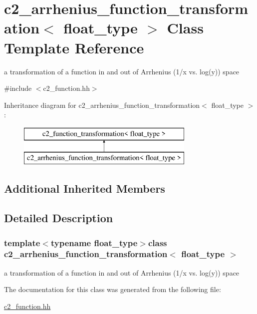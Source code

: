\hypertarget{classc2__arrhenius__function__transformation}{\section{c2\-\_\-arrhenius\-\_\-function\-\_\-transformation$<$ float\-\_\-type $>$ Class Template Reference}
\label{classc2__arrhenius__function__transformation}
}


a transformation of a function in and out of Arrhenius (1/x vs. log(y)) space  




{\ttfamily \#include $<$c2\-\_\-function.\-hh$>$}

Inheritance diagram for c2\-\_\-arrhenius\-\_\-function\-\_\-transformation$<$ float\-\_\-type $>$\-:\begin{figure}[H]
\begin{center}
\leavevmode
\includegraphics[height=2.000000cm]{classc2__arrhenius__function__transformation}
\end{center}
\end{figure}
\subsection*{Additional Inherited Members}


\subsection{Detailed Description}
\subsubsection*{template$<$typename float\-\_\-type$>$class c2\-\_\-arrhenius\-\_\-function\-\_\-transformation$<$ float\-\_\-type $>$}

a transformation of a function in and out of Arrhenius (1/x vs. log(y)) space 



The documentation for this class was generated from the following file\-:\begin{DoxyCompactItemize}
\item 
\hyperlink{c2__function_8hh}{c2\-\_\-function.\-hh}\end{DoxyCompactItemize}
